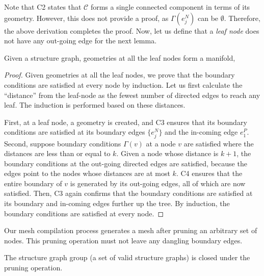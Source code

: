 Note that C2 states that $\mathcal{C}$ forms a single connected
component in terms of its geometry. However, this does not provide a
proof, as $\Gamma(e^N_j)$ can be $\emptyset$. Therefore, the above
derivation completes the proof. Now, let us define that a {\it leaf
node} does not have any out-going edge for the next lemma.

\begin{lemma}\label{lemma3} 
Given a structure graph, geometries at all the leaf nodes form a
manifold,
\end{lemma}

\begin{proof}
Given geometries at all the leaf nodes, we prove that the boundary
conditions are satisfied at every node by induction. Let us first
calculate the ``distance'' from the leaf-node as the fewest number of
directed edges to reach any leaf. The induction is performed based on
these distances.

First, at a leaf node, a geometry is created, and C3 ensures that its
boundary conditions are satisfied at its boundary edges $\{e^N_j\}$ and
the in-coming edge $e^P_1$.
%
Second, suppose boundary conditions $\Gamma(v)$ at a node $v$ are
satisfied where the distances are less than or equal to $k$.  Given a
node whose distance is $k+1$, the boundary conditions at the out-going
directed edges are satisfied, because the edges point to the nodes whose
distances are at most $k$. C4 ensures that the entire boundary of $v$ is
generated by its out-going edges, all of which are now satisfied.  Then, C3
again confirms that the boundary conditions are satisfied at its
boundary and in-coming edges further up the tree.
%
By induction, the boundary conditions are satisfied at every node.
\end{proof}

Our mesh compilation process generates a mesh after pruning an arbitrary
set of nodes. This pruning operation must not leave any dangling
boundary edges.

\begin{lemma}\label{lemma4}
The structure graph group (a set of valid structure graphs) is closed
 under the pruning operation.
\end{lemma}

